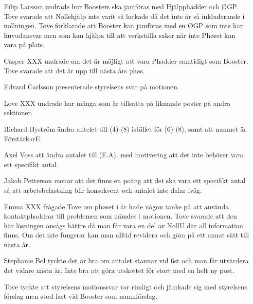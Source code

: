\documentclass[10pt]{article}
\begin{document}
\begin{paragrafer}
\begin{paragrafer}
      Filip Larsson undrade hur Boosters ska jämföras med Hjälpphadder och ØGP. Tove svarade att Nollehjälp inte varit så lockade då det inte är så inkluderande i nollningen. Tove förklarade att Booster kan jämföras med en ØGP som inte har huvudansvar men som kan hjälpa till att verkställa saker när inte Phøset kan vara på plats. 

      Casper XXX undrade om det är möjligt att vara Phadder samtidigt som Booster. Tove svarade att det är upp till nästa års phøs.
      


      Edvard Carlsson presenterade styrelsens svar på motionen. 
      
      Love XXX undrade hur många som är tillsatta på liknande poster på andra sektioner. 

      Richard Byström \ypa ändra antelet till (4)-(8) istället för (6)-(8), samt att namnet är FörstärkarE.

      Axel Voss \ypa att ändra antalet till (E.A), med motivering att det inte behöver vara ett specifikt antal.
      
      Jakob Petterson menar att det finns en poäng att det ska vara ett specifikt antal så att arbetsbelastning blir konsekvent och antalet inte dalar iväg. 

      Emma XXX frågade Tove om phøset i år hade någon tanke på att använda kontaktphaddrar till problemen som nämdes i motionen. Tove svarade att den här lösningen ansågs bättre då man får vara en del av NollU där all information finns. Om det inte fungerar kan man alltid revidera och göra på ett annat sätt till nästa år. 

      Stephanie Bol tyckte det är bra om antalet stannar vid 6st och man får utvärdera det vidare nästa är. Inte bra att göra utskottet för stort med en helt ny post. 

      

      Tove tyckte att styrelsens motionssvar var rimligt och jämkade sig med styrelsens förslag men stod fast vid Booster som namnförslag. 


\end{paragrafer}
\end{paragrafer}
\end{document}
